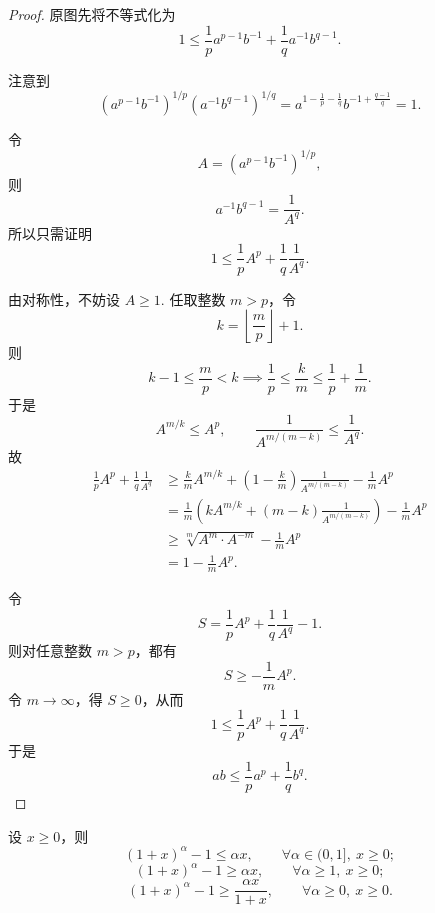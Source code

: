 \begin{proof}
原图先将不等式化为
\[
1\le \frac{1}{p}a^{p-1}b^{-1}+\frac{1}{q}a^{-1}b^{q-1}.
\]

注意到
\[
\left(a^{p-1}b^{-1}\right)^{1/p}\left(a^{-1}b^{q-1}\right)^{1/q}
=a^{1-\frac{1}{p}-\frac{1}{q}}b^{-1+\frac{q-1}{q}}
=1.
\]

令
\[
A=\left(a^{p-1}b^{-1}\right)^{1/p},
\]
则
\[
a^{-1}b^{q-1}=\frac{1}{A^q}.
\]
所以只需证明
\[
1\le \frac{1}{p}A^p+\frac{1}{q}\frac{1}{A^q}.
\]

由对称性，不妨设 $A \ge 1$. 任取整数 $m>p$，令
\[
k=\left\lfloor \frac{m}{p}\right\rfloor+1.
\]
则
\[
k-1\le \frac{m}{p}<k
\implies
\frac{1}{p}\le \frac{k}{m}\le \frac{1}{p}+\frac{1}{m}.
\]
于是
\[
A^{m/k}\le A^p,\qquad \frac{1}{A^{m/(m-k)}}\le \frac{1}{A^q}.
\]
故
\[
\begin{aligned}
\frac{1}{p}A^p+\frac{1}{q}\frac{1}{A^q}
&\ge \frac{k}{m}A^{m/k}+\left(1-\frac{k}{m}\right)\frac{1}{A^{m/(m-k)}}-\frac{1}{m}A^p \\
&=\frac{1}{m}\left(kA^{m/k}+(m-k)\frac{1}{A^{m/(m-k)}}\right)-\frac{1}{m}A^p \\
&\ge \sqrt[m]{A^m\cdot A^{-m}}-\frac{1}{m}A^p \\
&=1-\frac{1}{m}A^p.
\end{aligned}
\]

令
\[
S=\frac{1}{p}A^p+\frac{1}{q}\frac{1}{A^q}-1.
\]
则对任意整数 $m>p$，都有
\[
S\ge -\frac{1}{m}A^p.
\]
令 $m \to \infty$，得 $S \ge 0$，从而
\[
1\le \frac{1}{p}A^p+\frac{1}{q}\frac{1}{A^q}.
\]
于是
\[
ab\le \frac{1}{p}a^p+\frac{1}{q}b^q.
\]
\end{proof}

\begin{theorem}
设 $x \ge 0$，则
\[
(1+x)^\alpha-1\le \alpha x,\qquad \forall \alpha \in (0,1],\ x \ge 0;
\]
\[
(1+x)^\alpha-1\ge \alpha x,\qquad \forall \alpha \ge 1,\ x \ge 0;
\]
\[
(1+x)^\alpha-1\ge \frac{\alpha x}{1+x},\qquad \forall \alpha \ge 0,\ x \ge 0.
\]
\end{theorem}
